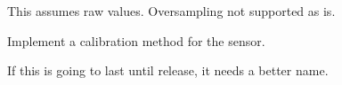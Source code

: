 
\begin{DoxyRefList}
\item[\label{todo__todo000001}%
\hypertarget{todo__todo000001}{}%
\-Member \hyperlink{classAnalogModule_a4d32e8352879088d4749efec89751313}{\-Analog\-Module\-:\-:\-Volts\-To\-Value} (\-I\-N\-T32 channel, float voltage)]\-This assumes raw values. \-Oversampling not supported as is. 
\item[\label{todo__todo000002}%
\hypertarget{todo__todo000002}{}%
\-Class \hyperlink{classHiTechnicCompass}{\-Hi\-Technic\-Compass} ]\-Implement a calibration method for the sensor.  
\item[\label{todo__todo000004}%
\hypertarget{todo__todo000004}{}%
\-Class \hyperlink{classSimpleRobot}{\-Simple\-Robot} ]\-If this is going to last until release, it needs a better name. 
\end{DoxyRefList}